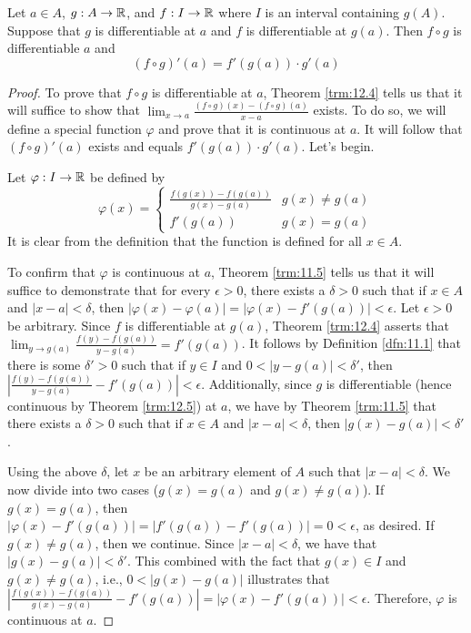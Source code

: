 \documentclass[../main.tex]{subfiles}
\begin{document}
\begin{theorem}\label{trm:12.10}
    Let $a\in A$, $g:A\to\mathbb{R}$, and $f:I\to\mathbb{R}$ where $I$ is an interval containing $g(A)$. Suppose that $g$ is differentiable at $a$ and $f$ is differentiable at $g(a)$. Then $f\circ g$ is differentiable $a$ and
    \begin{equation*}
        (f\circ g)'(a) = f'(g(a))\cdot g'(a)
    \end{equation*}
    \begin{proof}
        To prove that $f\circ g$ is differentiable at $a$, Theorem \ref{trm:12.4} tells us that it will suffice to show that $\lim_{x\to a}\frac{(f\circ g)(x)-(f\circ g)(a)}{x-a}$ exists. To do so, we will define a special function $\varphi$ and prove that it is continuous at $a$. It will follow that $(f\circ g)'(a)$ exists and equals $f'(g(a))\cdot g'(a)$. Let's begin.\par
        Let $\varphi:I\to\mathbb{R}$ be defined by
        \begin{equation*}
            \varphi(x) =
            \begin{cases}
                \frac{f(g(x))-f(g(a))}{g(x)-g(a)} & g(x)\neq g(a)\\
                f'(g(a)) & g(x)=g(a)
            \end{cases}
        \end{equation*}
        It is clear from the definition that the function is defined for all $x\in A$.\par
        To confirm that $\varphi$ is continuous at $a$, Theorem \ref{trm:11.5} tells us that it will suffice to demonstrate that for every $\epsilon>0$, there exists a $\delta>0$ such that if $x\in A$ and $|x-a|<\delta$, then $|\varphi(x)-\varphi(a)|=|\varphi(x)-f'(g(a))|<\epsilon$. Let $\epsilon>0$ be arbitrary. Since $f$ is differentiable at $g(a)$, Theorem \ref{trm:12.4} asserts that $\lim_{y\to g(a)}\frac{f(y)-f(g(a))}{y-g(a)}=f'(g(a))$. It follows by Definition \ref{dfn:11.1} that there is some $\delta'>0$ such that if $y\in I$ and $0<|y-g(a)|<\delta'$, then $|\frac{f(y)-f(g(a))}{y-g(a)}-f'(g(a))|<\epsilon$. Additionally, since $g$ is differentiable (hence continuous by Theorem \ref{trm:12.5}) at $a$, we have by Theorem \ref{trm:11.5} that there exists a $\delta>0$ such that if $x\in A$ and $|x-a|<\delta$, then $|g(x)-g(a)|<\delta'$.\par
        Using the above $\delta$, let $x$ be an arbitrary element of $A$ such that $|x-a|<\delta$. We now divide into two cases ($g(x)=g(a)$ and $g(x)\neq g(a)$). If $g(x)=g(a)$, then $|\varphi(x)-f'(g(a))|=|f'(g(a))-f'(g(a))|=0<\epsilon$, as desired. If $g(x)\neq g(a)$, then we continue. Since $|x-a|<\delta$, we have that $|g(x)-g(a)|<\delta'$. This combined with the fact that $g(x)\in I$ and $g(x)\neq g(a)$, i.e., $0<|g(x)-g(a)|$ illustrates that $|\frac{f(g(x))-f(g(a))}{g(x)-g(a)}-f'(g(a))|=|\varphi(x)-f'(g(a))|<\epsilon$. Therefore, $\varphi$ is continuous at $a$.\par

\end{proof}
\end{theorem}
\end{document}

